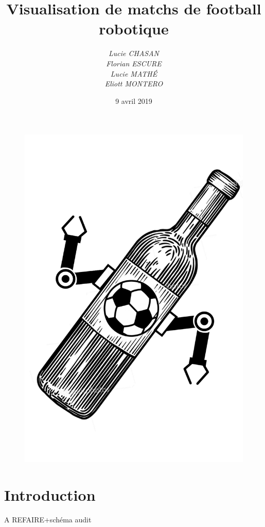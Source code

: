 \documentclass[a4paper,12pt]{report}
\title{Visualisation de matchs de football robotique}
\author{ 
\textit{Lucie CHASAN}\\
\textit{Florian ESCURE}\\
\textit{Lucie MATHÉ}\\
\textit{Eliott MONTERO}\\
}
\date{9 avril 2019}
\begin{document}
\begin{figure}[!b]  
\begin{center}  

\includegraphics[scale=1]{vin.png}  
\end{center}  
\end{figure}  

\maketitle

\newpage
\chapter{Introduction}
A REFAIRE+schéma audit
\end{document}
